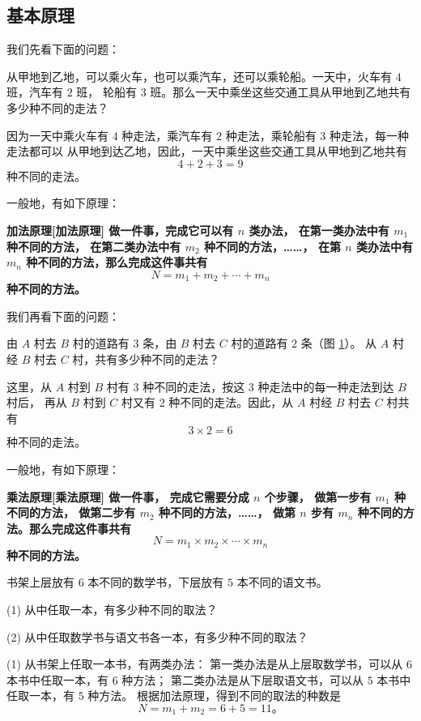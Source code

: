\subsection{基本原理}\label{subsec:2-1}

我们先看下面的问题：

从甲地到乙地，可以乘火车，也可以乘汽车，还可以乘轮船。一天中，火车有 $4$ 班，汽车有 $2$ 班，
轮船有 $3$ 班。那么一天中乘坐这些交通工具从甲地到乙地共有多少种不同的走法？

因为一天中乘火车有 $4$ 种走法，乘汽车有 $2$ 种走法，乘轮船有 $3$ 种走法，每一种走法都可以
从甲地到达乙地，因此，一天中乘坐这些交通工具从甲地到乙地共有
$$ 4 + 2 + 3 = 9 $$
种不同的走法。

一般地，有如下原理：

\textbf{加法原理[加法原理] \quad 做一件事，完成它可以有 $n$ 类办法，
    在第一类办法中有 $m_1$ 种不同的方法，
    在第二类办法中有 $m_2$ 种不同的方法，……，
    在第 $n$ 类办法中有 $m_n$ 种不同的方法，那么完成这件事共有
    $$ N = m_1 + m_2 + \cdots + m_n $$
    种不同的方法。
}

我们再看下面的问题：

由 $A$ 村去 $B$ 村的道路有 $3$ 条，由 $B$ 村去 $C$ 村的道路有 $2$ 条（图 \ref{fig:2-1}）。
从 $A$ 村经 $B$ 村去 $C$ 村，共有多少种不同的走法？

\begin{figure}[htbp]
    \centering
    
    \caption{}\label{fig:2-1}
\end{figure}

这里，从 $A$ 村到 $B$ 村有 $3$ 种不同的走法，按这 $3$ 种走法中的每一种走法到达 $B$ 村后，
再从 $B$ 村到 $C$ 村又有 $2$ 种不同的走法。因此，从 $A$ 村经 $B$ 村去 $C$ 村共有
$$ 3 \times 2 = 6 $$
种不同的走法。

一般地，有如下原理：

\textbf{乘法原理[乘法原理] \quad
    做一件事， 完成它需要分成 $n$ 个步骤，
    做第一步有 $m_1$ 种不同的方法，
    做第二步有 $m_2$ 种不同的方法，……，
    做第 $n$ 步有 $m_n$ 种不同的方法。那么完成这件事共有
    $$ N = m_1 \times m_2 \times \cdots \times m_n $$
    种不同的方法。
}

\liti 书架上层放有 $6$ 本不同的数学书，下层放有 $5$ 本不同的语文书。

(1) 从中任取一本，有多少种不同的取法？

(2) 从中任取数学书与语文书各一本，有多少种不同的取法？

\jie (1) 从书架上任取一本书，有两类办法：
第一类办法是从上层取数学书，可以从 $6$ 本书中任取一本，有 $6$ 种方法；
第二类办法是从下层取语文书，可以从 $5$ 本书中任取一本，有 $5$ 种方法。
根据加法原理，得到不同的取法的种数是
$$ N = m_1 + m_2 = 6 + 5 = 11 \text{。} $$

